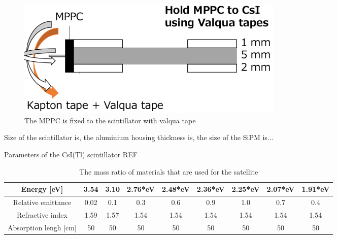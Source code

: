 \documentclass[12pt, a4paper,titlepage]{article}
\numberwithin{equation}{section}
\numberwithin{figure}{section}
\begin{document}
\begin{figure}
\includegraphics[width=130.0mm]{images/tap1channel.png}
\caption{\label{fig:1channeltape} The MPPC is fixed to the scintillator with valqua tape}
\end{figure}



Size of the scintillator is, the aluminium housing thickness is, the size of the SiPM is...

Parameters of the CsI(Tl) scintillator REF



\begin{table}[h!]
\begin{center}
\begin{tabular}{ |c|c|c|c|c|c|c|c|c|} 
 \hline
 Energy [eV] & 3.54 & 3.10 & 2.76*eV & 2.48*eV & 2.36*eV & 2.25*eV & 2.07*eV & 1.91*eV\\\hline
 Relative emittance & 0.02 & 0.1 & 0.3 & 0.6 & 0.9 & 1.0 & 0.7 & 0.4 \\\hline
 Refractive index & 1.59 & 1.57 & 1.54 & 1.54 & 1.54 & 1.54 & 1.54 & 1.54 \\\hline
 Absorption lengh [cm] & 50 & 50 & 50 & 50 & 50 & 50 & 50 & 50  \\\hline
 

 \hline
\end{tabular}
\end{center}
\caption{The mass ratio of materials that are used for the satellite}
\end{table}



  
\end{document}

